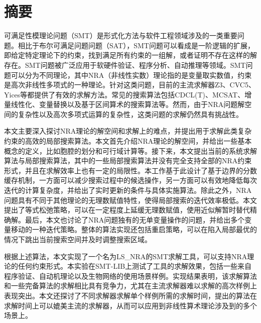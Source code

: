 \maketitle%
\MAKETITLE%
\makedeclaration%
\intobmk\chapter*{摘\quad 要}%
\setcounter{page}{1}%

可满足性模理论问题（SMT）是形式化方法与软件工程领域涉及的一类重要问题。相比于布尔可满足问题问题（SAT），SMT问题可以看成是一阶逻辑的扩展，即给定特定理论下的约束，找到满足所有约束的一组解，或者证明不存在这样的解存在。SMT问题被广泛应用于软硬件验证、程序分析、自动推理等领域。SMT问题可以分为不同理论，其中NRA（非线性实数）理论指的是变量取实数值，约束是高次非线性多项式的一种理论。针对这类问题，目前的主流求解器Z3、CVC5、Yices等都提供了有效的求解方法。常见的搜索算法包括CDCL(T)、MCSAT、增量线性化、变量替换以及基于区间算术的搜索算法等。然而，由于NRA问题解空间的复杂性以及高次多项式运算的复杂性，这类问题的求解仍然具有挑战性。

本文主要深入探讨NRA理论的解空间和求解上的难点，并提出用于求解此类复杂约束的高效的局部搜索算法。本文首先介绍NRA理论的解空间，并给出一些基本概念的定义，比如胞腔的划分和可行域计算等。接下来，本文提出当前的系统求解算法与局部搜索算法，其中的一些局部搜索算法并没有完全支持全部的NRA约束形式，并且在求解效率上也有一定的局限性。本工作基于此设计了基于边界的分数缓存机制，一方面可以减少搜索过程中的候选操作，另一方面可以有效地降低每次迭代的计算复杂度，并给出了实时更新的条件与具体实施算法。除此之外，NRA问题具有不同于其他理论的无理数赋值特性，使得局部搜索的迭代效率极低。本文提出了等式松弛策略，可以在一定程度上延缓无理数赋值，使用近似解暂时替代精确解。最后，本文也讨论了NRA问题独有的无单变量操作的问题，并给出多个变量移动的一种迭代策略。整体的算法实现还包括重启策略，可以在陷入局部最优的情况下跳出当前搜索空间并及时调整搜索区域。

根据上述算法，本文实现了一个名为LS\_NRA的SMT求解工具，可以支持NRA理论的任何约束形式。本实验在SMT-LIB上测试了工具的求解效果，包括一些来自程序验证、自动机理论以及生物网络的使用场景样例。实现结果表明，该求解算法和一些完备算法的求解相比具有竞争力，尤其在主流求解器难以求解的高次样例上表现突出。本文还探讨了不同求解器求解单个样例所需的求解时间，提出的算法在求解时间上可以媲美主流的求解器，从而可以应用到非线性算术理论涉及到的多个场景上。


